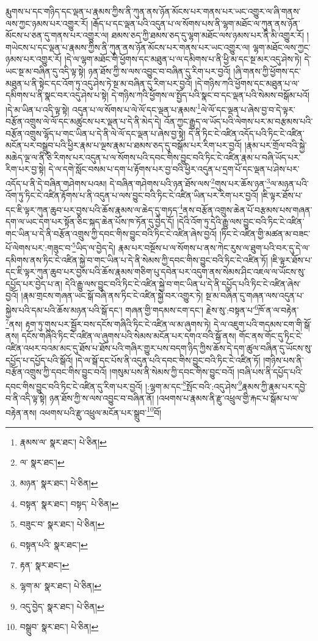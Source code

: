 རྨུགས་པ་དང་གཉིད་དང་ལྡན་པ་རྣམས་ཀྱིས་ནི་ཀུན་ནས་ཉོན་མོངས་པར་གནས་པར་ཡང་འགྱུར་ལ་ཞི་གནས་ལས་ཀྱང་ཉམས་པར་འགྱུར་རོ། །རྒོད་པ་དང་ལྡན་པའི་འདུན་པ་ལ་སོགས་པས་ནི་ལྷག་མཐོང་ལ་ཀུན་ནས་ཉོན་མོངས་པ་ཅན་དུ་གནས་པར་འགྱུར་ལ། ཐམས་ཅད་ཀྱི་ཐམས་ཅད་དུ་ལྷག་མཐོང་ལས་ཉམས་པར་ནི་མི་འགྱུར་རོ། །གཡེངས་པ་དང་ལྡན་པ་རྣམས་ཀྱིས་ནི་ཀུན་ནས་ཉོན་མོངས་པར་གནས་པར་ཡང་འགྱུར་ལ། ལྷག་མཐོང་ལས་ཀྱང་ཉམས་པར་འགྱུར་རོ། །དེ་ལ་ལྷག་མཐོང་གི་ཕྱོགས་དང་མཐུན་པ་ལ་དམིགས་པ་ནི་ཕྱི་མ་དང་སྔ་མར་འདུ་ཤེས་ཏེ། དེ་ཡང་སྔ་མ་བཞིན་དུ་འདི་ལྟ་སྟེ། ཉན་ཐོས་ཀྱི་ས་ལས་འབྱུང་བ་བཞིན་དུ་རིག་པར་བྱའོ། །ཞི་གནས་ཀྱི་ཕྱོགས་དང་མཐུན་པ་ནི་སྟེང་དང་འོག་ཏུ་འདུ་ཤེས་ཏེ་སྔ་མ་བཞིན་དུ་རིག་པར་བྱའོ། །དེ་གཉིས་ཀའི་ཕྱོགས་དང་མཐུན་པ་ལ་དམིགས་པ་ནི་སྣང་བར་འདུ་ཤེས་པ་སྟེ། དེ་གཉིས་ཀའི་ཕྱོགས་ལ་སྤྱོད་པའི་སྣང་བ་དང་ལྡན་པའི་སེམས་བསྒོམ་པའོ། །དེ་མ་ཡིན་པ་འདི་ལྟ་སྟེ། འདུན་པ་ལ་སོགས་པ་ལེ་ལོ་དང་ལྡན་པ་རྣམས་\footnote{རྣམས་ལ་  སྣར་ཐང་།  པེ་ཅིན། }ལེ་ལོ་དང་ལྡན་པ་ཞེས་བྱ་བ་དེ་ལྟར་བརྩོན་འགྲུས་ལེ་ལོ་དང་མཚུངས་པར་ལྡན་པ་དེ་ནི་མེད་དེ། འོན་ཀྱང་རྒྱུད་ལ་ཡོད་པའི་ལེགས་པར་མ་བརྩམས་པའི་བརྩོན་འགྲུས་ལྷོད་པ་གང་ཡིན་པ་དེ་ནི་ལེ་ལོ་དང་ལྡན་པ་ཞེས་བྱ་སྟེ། དེ་ནི་ཏིང་ངེ་འཛིན་འདོད་པའི་ཏིང་ངེ་འཛིན་མངོན་པར་བསྒྲུབ་པའི་ཕྱིར་རྣམ་པ་ལྔས་རྣམ་པ་ཐམས་ཅད་དུ་བསྒོམ་པར་རིག་པར་བྱའོ། །རྣམ་པར་གྲོལ་བའི་སྐྱེ་མཆེད་ལྔ་ལ་ནི་ཅི་རིགས་པར་འདུན་པ་ལ་སོགས་པའི་དབང་གིས་བྱུང་བའི་ཏིང་ངེ་འཛིན་རྣམ་པ་བཞི་ཡོད་པར་རིག་པར་བྱ་སྟེ། དེ་ལ་དགེ་སློང་བསམ་པ་དག་པ་རྟོགས་པར་བྱ་བའི་ཕྱིར་འདུན་པ་དྲག་པོ་དང་ལྡན་པ་ཤེས་པར་འདོད་པ་ནི་དེ་བཞིན་གཤེགས་པའམ། དེ་བཞིན་གཤེགས་པའི་ཉན་ཐོས་ལས་\footnote{ལ་  སྣར་ཐང་། }གུས་པར་ཆོས་ཉན་\footnote{མཉན་  སྣར་ཐང་།  པེ་ཅིན། }ལ་མཉན་པའི་འོག་ཏུ་ཏིང་ངེ་འཛིན་རྟོགས་པ་ནི་འདུན་པ་ལས་བྱུང་བའི་ཏིང་ངེ་འཛིན་ཡིན་པར་རིག་པར་བྱའོ། །ཇི་ལྟར་ཐོས་པ་དང་ཇི་ལྟར་ཀུན་ཆུབ་པར་བྱས་པའི་ཆོས་རྣམས་ལ་ཆེད་དུ་གཏད་\footnote{བསྟན་  སྣར་ཐང་། བསྟད་  པེ་ཅིན། }ནས་བརྩོན་འགྲུས་ཆེན་པོ་བརྩམས་པས་གཞན་དག་ལ་ཡང་དག་པར་སྟོན་ཅིང་སྐད་ཆེན་པོས་ཁ་ཏོན་དུ་བྱེད་དོ། །དེའི་འོག་ཏུ་དེའི་རྒྱུ་ལས་བྱུང་བའི་ཏིང་ངེ་འཛིན་གང་ཡིན་པ་དེ་ནི་བརྩོན་འགྲུས་ཀྱི་དབང་གིས་བྱུང་བའི་ཏིང་ངེ་འཛིན་ཞེས་བྱའོ། །ཏིང་ངེ་འཛིན་གྱི་མཚན་མ་བཟང་པོ་ལེགས་པར་:གཟུང་བ་\footnote{བཟུང་བ་  སྣར་ཐང་།  པེ་ཅིན། }ཡིད་ལ་བྱེད་དེ། རྣམ་པར་བསྔོས་པ་ལ་སོགས་པ་ནས་ཀེང་རུས་ལ་ཐུག་པའི་བར་དུ་དེ་ལ་དམིགས་ནས་ཏིང་ངེ་འཛིན་སྐྱེ་བ་གང་ཡིན་པ་དེ་ནི་སེམས་ཀྱི་དབང་གིས་བྱུང་བའི་ཏིང་ངེ་འཛིན་ཏོ། །ཇི་ལྟར་ཐོས་པ་དང་ཇི་ལྟར་ཀུན་ཆུབ་པར་བྱས་པའི་ཆོས་རྣམས་གཅིག་པུ་དབེན་པར་འདུག་ནས་སེམས་ཤིང་འཇལ་ལ་ཡོངས་སུ་དཔྱོད་པར་བྱེད་པ་ན། དེའི་རྒྱུ་ལས་བྱུང་བའི་ཏིང་ངེ་འཛིན་སྐྱེ་བ་གང་ཡིན་པ་དེ་ནི་དཔྱོད་པའི་ཏིང་ངེ་འཛིན་ཞེས་བྱའོ། །རྣམ་གྲངས་གཞན་ཡང་སྒོ་བཞི་ནས་ཏིང་ངེ་འཛིན་སྐྱེ་བར་འགྱུར་ཏེ། སྔ་མ་བཞིན་དུ་གཞན་ལས་འདུན་པ་སྐྱེས་པའི་དམ་པའི་ཆོས་མཉན་པའི་སྒོ་དང་། གཞན་གྱི་གདམས་ངག་དང་། རྗེས་སུ་:བསྟན་པ་\footnote{བསྟན་པའི་  སྣར་ཐང་། }ཁོ་ན་ལ་བརྟེན་\footnote{རྟན་  སྣར་ཐང་། }ནས། རྟག་ཏུ་གུས་པར་སྦྱོར་བས་དངོས་གཞིའི་ཏིང་ངེ་འཛིན་ལ་མ་ཞུགས་ཏེ། དེ་ལ་འཇུག་པའི་གདམས་ངག་གི་སྒོ་ནས། དངོས་གཞིའི་ཏིང་ངེ་འཛིན་ལ་ཞུགས་པའི་སེམས་མངོན་པར་དགའ་བའི་སྒོ་ནས། གོང་ནས་གོང་དུ་ཏིང་ངེ་འཛིན་འཕར་བའམ་མང་དུ་ཐོས་པ་ཐོས་པའི་གཞིར་གྱུར་པས་བདག་ཉིད་ཀྱིས་ཆོས་དེ་དག་ཚུལ་བཞིན་དུ་ཡོངས་སུ་དཔྱོད་པ་དཔྱོད་པའི་སྒོའོ། །དེ་ལ་སྒོ་དང་པོས་ནི་འདུན་པའི་དབང་གིས་བྱུང་བའི་ཏིང་ངེ་འཛིན་ཏོ། །གཉིས་པས་ནི་བརྩོན་འགྲུས་ཀྱི་དབང་གིས་བྱུང་བའོ། །གསུམ་པས་ནི་སེམས་ཀྱི་དབང་གིས་བྱུང་བའོ། །བཞི་པས་ནི་དཔྱོད་པའི་དབང་གིས་བྱུང་བའི་ཏིང་ངེ་འཛིན་དུ་རིག་པར་བྱའོ། །:ལྷག་མ་དང་\footnote{ལྷག་མ་  སྣར་ཐང་།  པེ་ཅིན། }སྤོང་བའི་:འདུ་ཤེས་\footnote{འདུ་བྱེད་  སྣར་ཐང་།  པེ་ཅིན། }རྣམས་ཀྱི་རྣམ་པར་དབྱེ་བ་ནི་འདི་ལྟ་སྟེ། ཉན་ཐོས་ཀྱི་ས་ལས་འབྱུང་བ་བཞིན་ནོ། །འཕགས་པ་རྣམས་ནི་རྫུ་འཕྲུལ་གྱི་རྐང་པ་སྒོམ་པ་ལ་བརྟེན་ནས། འཕགས་པའི་རྫུ་འཕྲུལ་མངོན་པར་སྒྲུབ་\footnote{བསྒྲུབ་  སྣར་ཐང་།  པེ་ཅིན། }བོ། 